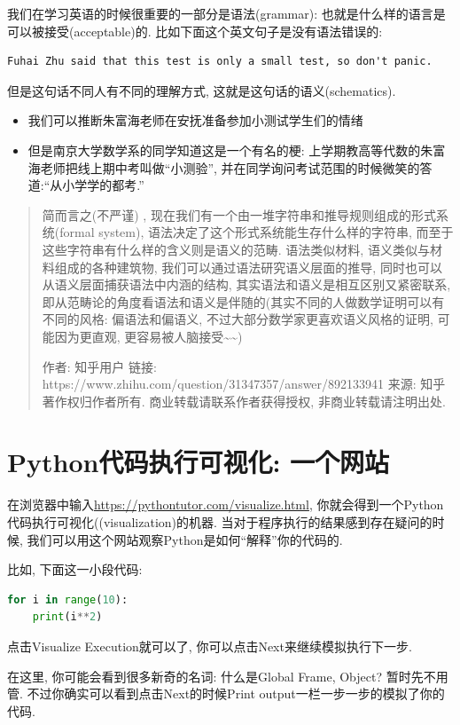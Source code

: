 我们在学习英语的时候很重要的一部分是语法(grammar): 也就是什么样的语言是可以被接受(acceptable)的. 比如下面这个英文句子是没有语法错误的: 
\begin{verbatim}
Fuhai Zhu said that this test is only a small test, so don't panic.
\end{verbatim}
但是这句话不同人有不同的理解方式, 这就是这句话的语义(schematics). 
\begin{itemize}
\item 我们可以推断朱富海老师在安抚准备参加小测试学生们的情绪
\item 但是南京大学数学系的同学知道这是一个有名的梗: 上学期教高等代数的朱富海老师把线上期中考叫做``小测验'', 并在同学询问考试范围的时候微笑的答道:``从小学学的都考.''
\end{itemize}
\begin{quote}
简而言之(不严谨) , 现在我们有一个由一堆字符串和推导规则组成的形式系统(formal system), 语法决定了这个形式系统能生存什么样的字符串, 而至于这些字符串有什么样的含义则是语义的范畴.
语法类似材料, 语义类似与材料组成的各种建筑物, 我们可以通过语法研究语义层面的推导, 同时也可以从语义层面捕获语法中内涵的结构,
其实语法和语义是相互区别又紧密联系, 即从范畴论的角度看语法和语义是伴随的(其实不同的人做数学证明可以有不同的风格: 偏语法和偏语义,
不过大部分数学家更喜欢语义风格的证明, 可能因为更直观, 更容易被人脑接受\textasciitilde\textasciitilde ) 

作者: 知乎用户 链接: https://www.zhihu.com/question/31347357/answer/892133941
来源: 知乎 著作权归作者所有. 商业转载请联系作者获得授权, 非商业转载请注明出处. 
\end{quote}

\section{Python代码执行可视化: 一个网站}

\begin{tool}
在浏览器中输入\url{https://pythontutor.com/visualize.html}, 你就会得到一个Python代码执行可视化((visualization)的机器. 当对于程序执行的结果感到存在疑问的时候, 我们可以用这个网站观察Python是如何``解释''你的代码的.

比如, 下面这一小段代码: 
\begin{lstlisting}[language=python]
for i in range(10):
    print(i**2)
\end{lstlisting}

点击Visualize Execution就可以了, 你可以点击Next来继续模拟执行下一步.

在这里, 你可能会看到很多新奇的名词: 什么是Global Frame, Object? 暂时先不用管. 不过你确实可以看到点击Next的时候Print output一栏一步一步的模拟了你的代码. 
\end{tool}

